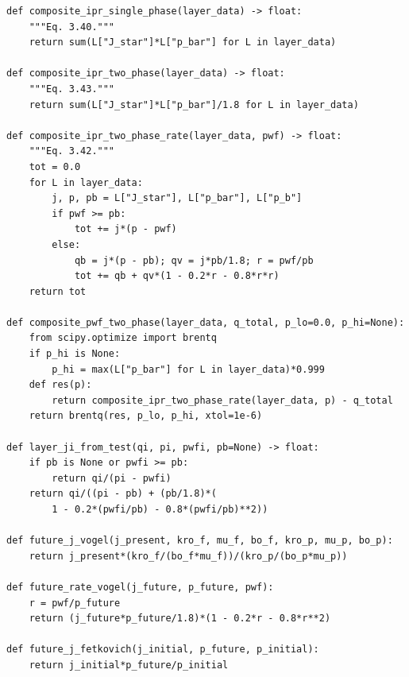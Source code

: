 \documentclass[10pt,a4paper,openany]{book}
\begin{document}
\begin{lstlisting}
def composite_ipr_single_phase(layer_data) -> float:
    """Eq. 3.40."""
    return sum(L["J_star"]*L["p_bar"] for L in layer_data)

def composite_ipr_two_phase(layer_data) -> float:
    """Eq. 3.43."""
    return sum(L["J_star"]*L["p_bar"]/1.8 for L in layer_data)

def composite_ipr_two_phase_rate(layer_data, pwf) -> float:
    """Eq. 3.42."""
    tot = 0.0
    for L in layer_data:
        j, p, pb = L["J_star"], L["p_bar"], L["p_b"]
        if pwf >= pb:
            tot += j*(p - pwf)
        else:
            qb = j*(p - pb); qv = j*pb/1.8; r = pwf/pb
            tot += qb + qv*(1 - 0.2*r - 0.8*r*r)
    return tot

def composite_pwf_two_phase(layer_data, q_total, p_lo=0.0, p_hi=None):
    from scipy.optimize import brentq
    if p_hi is None:
        p_hi = max(L["p_bar"] for L in layer_data)*0.999
    def res(p):
        return composite_ipr_two_phase_rate(layer_data, p) - q_total
    return brentq(res, p_lo, p_hi, xtol=1e-6)

def layer_ji_from_test(qi, pi, pwfi, pb=None) -> float:
    if pb is None or pwfi >= pb:
        return qi/(pi - pwfi)
    return qi/((pi - pb) + (pb/1.8)*(
        1 - 0.2*(pwfi/pb) - 0.8*(pwfi/pb)**2))

def future_j_vogel(j_present, kro_f, mu_f, bo_f, kro_p, mu_p, bo_p):
    return j_present*(kro_f/(bo_f*mu_f))/(kro_p/(bo_p*mu_p))

def future_rate_vogel(j_future, p_future, pwf):
    r = pwf/p_future
    return (j_future*p_future/1.8)*(1 - 0.2*r - 0.8*r**2)

def future_j_fetkovich(j_initial, p_future, p_initial):
    return j_initial*p_future/p_initial
\end{lstlisting}
\end{document}
